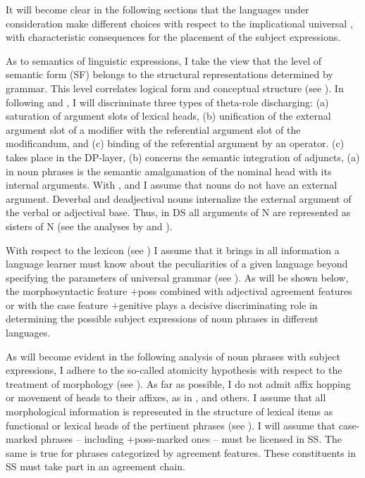 \documentclass[output=paper,colorlinks,citecolor=brown]{langscibook}
\begin{document}
\noindent It will become clear in the following sections that the languages under consideration make different choices with respect to the implicational universal , with characteristic consequences for the placement of the subject expressions.

As to semantics of linguistic expressions, I take the view that the level of semantic form (SF) belongs to the structural representations determined by grammar. This level correlates logical form and conceptual structure (see \citealt{Bierwisch87Semantik-der, Bierwisch88On-the, Bierwisch89Event-nominalizations:}). In following \citet{Higginbotham85On-semantics} and \citet{Bierwisch87Semantik-der, Bierwisch88On-the, Bierwisch89Event-nominalizations:}, I will discriminate three types of theta-role discharging: (a) saturation of argument slots of lexical heads, (b) unification of the external argument slot of a modifier with the referential argument slot of the modificandum, and (c) binding of the referential argument by an operator. (c) takes place in the DP-layer, (b) concerns the semantic integration of adjuncts, (a) in noun phrases is the semantic amalgamation of the nominal head with its internal arguments. With \citet{Williams81Argument-structure}, \citet{di1987definition} and \citet{Bierwisch88On-the, Bierwisch89Event-nominalizations:} I assume that nouns do not have an external argument. Deverbal and deadjectival nouns internalize the external argument of the verbal or adjectival base. Thus, in DS all arguments of N are represented as sisters of N (see the analyses by \citealt{Bischof91Sachverhaltsbezeichnungen-des} and \citealt{Freytag91Sachverhaltsbezeichnungen-des}).

With respect to the lexicon (see \citealt{Zimmermann87Die-Argumentstruktur, Zimmermann87Die-Rolle-Lexikons}) I assume that it brings in all information a language learner must know about the peculiarities of a given language beyond specifying the parameters of universal grammar (see \citealt{Felix88Structure-functional}). As will be shown below, the morphosyntactic feature $+$poss combined with adjectival agreement features or with the case feature $+$genitive plays a decisive discriminating role in determining the possible subject expressions of noun phrases in different languages.

As will become evident in the following analysis of noun phrases with subject expressions, I adhere to the so-called atomicity hypothesis with respect to the treatment of morphology (see \citealt{di1987definition}). As far as possible, I do not admit affix hopping or movement of heads to their affixes, as in \citet{Pollock89Verb-movement}, \citet{Chomsky86Barriers, Chomsky89Some-notes} and others. I assume that all morphological information is represented in the structure of lexical items as functional or lexical heads of the pertinent phrases (see \citealt{Zimmermann88Die-substantivische-Verwendung, Zimmermann88Wohin-mit-Affixen}). I will assume that case-marked phrases -- including $+$poss-marked ones -- must be licensed in SS. The same is true for phrases categorized by agreement features. These constituents in SS must take part in an agreement chain.
\end{document}
